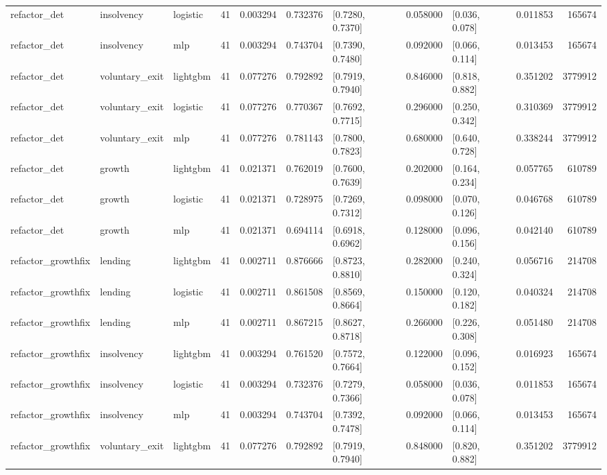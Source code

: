 \begin{table}
{\begin{tabular}{lllrrrlrlrr}
refactor_det & insolvency & logistic & 41 & 0.003294 & 0.732376 & [0.7280, 0.7370] & 0.058000 & [0.036, 0.078] & 0.011853 & 165674 \\
refactor_det & insolvency & mlp & 41 & 0.003294 & 0.743704 & [0.7390, 0.7480] & 0.092000 & [0.066, 0.114] & 0.013453 & 165674 \\
refactor_det & voluntary_exit & lightgbm & 41 & 0.077276 & 0.792892 & [0.7919, 0.7940] & 0.846000 & [0.818, 0.882] & 0.351202 & 3779912 \\
refactor_det & voluntary_exit & logistic & 41 & 0.077276 & 0.770367 & [0.7692, 0.7715] & 0.296000 & [0.250, 0.342] & 0.310369 & 3779912 \\
refactor_det & voluntary_exit & mlp & 41 & 0.077276 & 0.781143 & [0.7800, 0.7823] & 0.680000 & [0.640, 0.728] & 0.338244 & 3779912 \\
refactor_det & growth & lightgbm & 41 & 0.021371 & 0.762019 & [0.7600, 0.7639] & 0.202000 & [0.164, 0.234] & 0.057765 & 610789 \\
refactor_det & growth & logistic & 41 & 0.021371 & 0.728975 & [0.7269, 0.7312] & 0.098000 & [0.070, 0.126] & 0.046768 & 610789 \\
refactor_det & growth & mlp & 41 & 0.021371 & 0.694114 & [0.6918, 0.6962] & 0.128000 & [0.096, 0.156] & 0.042140 & 610789 \\
refactor_growthfix & lending & lightgbm & 41 & 0.002711 & 0.876666 & [0.8723, 0.8810] & 0.282000 & [0.240, 0.324] & 0.056716 & 214708 \\
refactor_growthfix & lending & logistic & 41 & 0.002711 & 0.861508 & [0.8569, 0.8664] & 0.150000 & [0.120, 0.182] & 0.040324 & 214708 \\
refactor_growthfix & lending & mlp & 41 & 0.002711 & 0.867215 & [0.8627, 0.8718] & 0.266000 & [0.226, 0.308] & 0.051480 & 214708 \\
refactor_growthfix & insolvency & lightgbm & 41 & 0.003294 & 0.761520 & [0.7572, 0.7664] & 0.122000 & [0.096, 0.152] & 0.016923 & 165674 \\
refactor_growthfix & insolvency & logistic & 41 & 0.003294 & 0.732376 & [0.7279, 0.7366] & 0.058000 & [0.036, 0.078] & 0.011853 & 165674 \\
refactor_growthfix & insolvency & mlp & 41 & 0.003294 & 0.743704 & [0.7392, 0.7478] & 0.092000 & [0.066, 0.114] & 0.013453 & 165674 \\
refactor_growthfix & voluntary_exit & lightgbm & 41 & 0.077276 & 0.792892 & [0.7919, 0.7940] & 0.848000 & [0.820, 0.882] & 0.351202 & 3779912 \\

\end{tabular}}
\end{table}
